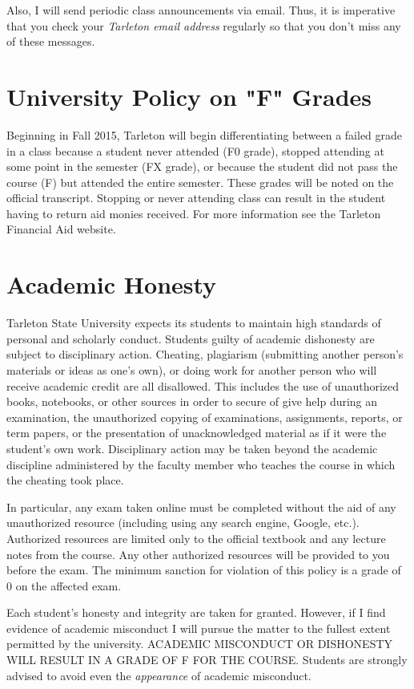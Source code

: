 \documentclass[10pt]{article}
\begin{document}
Also, I will send periodic class announcements via email.  Thus, it is imperative that you check your \emph{Tarleton email address} regularly so that you don't miss any of these messages.

\section*{University Policy on "F" Grades}
\label{sec:orge70a595}
Beginning in Fall 2015, Tarleton will begin differentiating between a failed grade in a class because a student never attended (F0 grade), stopped attending at some point in the semester (FX grade), or because the student did not pass the course (F) but attended the entire semester. These grades will be noted on the official transcript. Stopping or never attending class can result in the student having to return aid monies received.  For more information see the Tarleton Financial Aid website.

\section*{Academic Honesty}
\label{sec:org377d3b9}

Tarleton State University expects its students to maintain high standards of personal and scholarly conduct. Students guilty of academic dishonesty are subject to disciplinary action. Cheating, plagiarism (submitting another person’s materials or ideas as one’s own), or doing work for another person who will receive academic credit are all disallowed. This includes the use of unauthorized books, notebooks, or other sources in order to secure of give help during an examination, the unauthorized copying of examinations, assignments, reports, or term papers, or the presentation of unacknowledged material as if it were the student’s own work. Disciplinary action may be taken beyond the academic discipline administered by the faculty member who teaches the course in which the cheating took place.

In particular, any exam taken online must be completed without the aid of any unauthorized resource (including using any search engine, Google, etc.).  Authorized resources are limited only to the official textbook and any lecture notes from the course.  Any other authorized resources will be provided to you before the exam.  The minimum sanction for violation of this policy is a grade of 0 on the affected exam.

Each student’s honesty and integrity are taken for granted. However, if I find evidence of academic misconduct I will pursue the matter to the fullest extent permitted by the university. ACADEMIC MISCONDUCT OR DISHONESTY WILL RESULT IN A GRADE OF F FOR THE COURSE.  Students are strongly advised to avoid even the \emph{appearance} of academic misconduct. 
\end{document}
